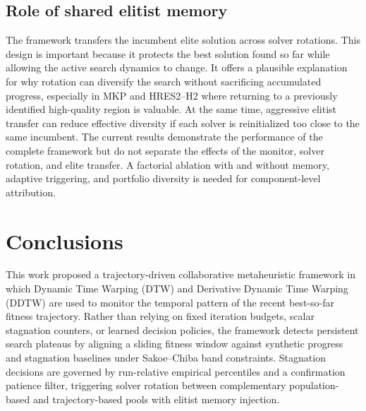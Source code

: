 \documentclass[review]{elsarticle}
\begin{document}
\subsection{Role of shared elitist memory}
\label{sec:discussion-memory}

The framework transfers the incumbent elite solution across solver rotations.
This design is important because it protects the best solution found so far
while allowing the active search dynamics to change. It offers a plausible
explanation for why rotation can diversify the search without sacrificing
accumulated progress, especially in MKP and HRES2--H2 where returning to a
previously identified high-quality region is valuable. At the same time,
aggressive elitist transfer can reduce effective diversity if each solver is
reinitialized too close to the same incumbent. The current results demonstrate
the performance of the complete framework but do not separate the effects of
the monitor, solver rotation, and elite transfer. A factorial ablation with and
without memory, adaptive triggering, and portfolio diversity is needed for
component-level attribution.


\section{Conclusions}
\label{sec:conclusions}

This work proposed a trajectory-driven collaborative metaheuristic framework in which Dynamic Time Warping (DTW) and Derivative Dynamic Time Warping (DDTW) are used to monitor the temporal pattern of the recent best-so-far fitness trajectory. Rather than relying on fixed iteration budgets, scalar stagnation counters, or learned decision policies, the framework detects persistent search plateaus by aligning a sliding fitness window against synthetic progress and stagnation baselines under Sakoe--Chiba band constraints. Stagnation decisions are governed by run-relative empirical percentiles and a confirmation patience filter, triggering solver rotation between complementary population-based and trajectory-based pools with elitist memory injection.
\end{document}
